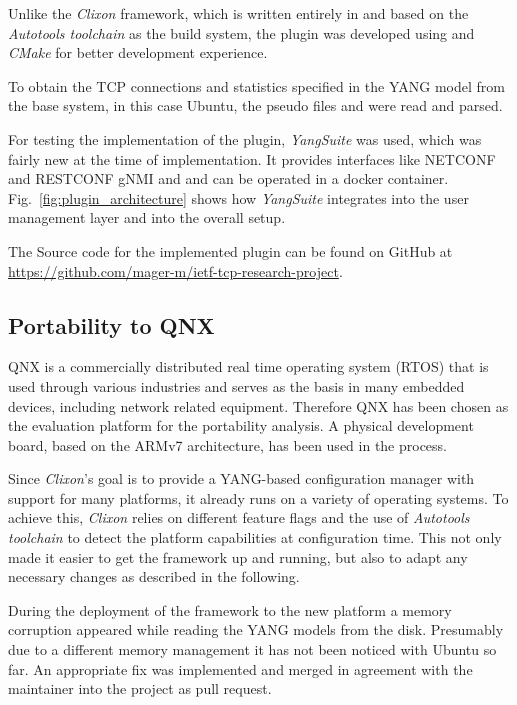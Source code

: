 Unlike the \textit{Clixon} framework, which is written entirely in  and based on the \textit{Autotools toolchain} as the build system, the plugin was developed using  and \textit{CMake} for better development experience.

To obtain the TCP connections and statistics specified in the YANG model from the base system, in this case Ubuntu, the pseudo files  and  were read and parsed.

For testing the implementation of the plugin, \textit{YangSuite} was used, which was fairly new at the time of implementation. It provides interfaces like NETCONF and RESTCONF gNMI and and can be operated in a docker container. Fig.~\ref{fig:plugin_architecture} shows how \textit{YangSuite} integrates into the user management layer and into the overall setup.

The Source code for the implemented plugin can be found on GitHub at \url{https://github.com/mager-m/ietf-tcp-research-project}.

\subsection{Portability to QNX}
\label{Portability to QNX}

QNX is a commercially distributed real time operating system (RTOS) that is used through various industries and serves as the basis in many embedded devices, including network related equipment. Therefore QNX has been chosen as the evaluation platform for the portability analysis. A physical development board, based on the ARMv7 architecture, has been used in the process.

Since \textit{Clixon}'s goal is to provide a YANG-based configuration manager with support for many platforms, it already runs on a variety of operating systems. To achieve this, \textit{Clixon} relies on different feature flags and the use of \textit{Autotools toolchain} to detect the platform capabilities at configuration time. This not only made it easier to get the framework up and running, but also to adapt any necessary changes as described in the following. 

During the deployment of the framework to the new platform a memory corruption appeared while reading the YANG models from the disk. Presumably due to a different memory management it has not been noticed with Ubuntu so far. An appropriate fix was implemented and merged in agreement with the maintainer into the project as pull request.

